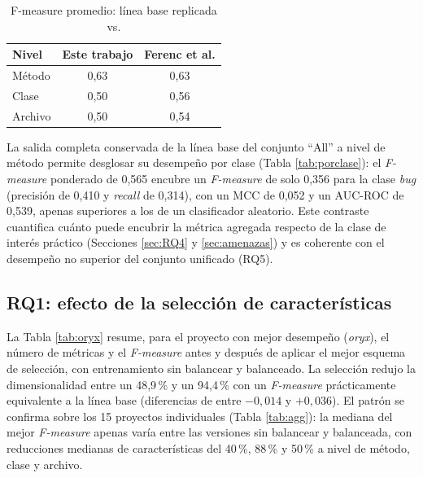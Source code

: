 \documentclass[conference,a4paper]{IEEEtran}
\begin{document}
\begin{table}[H]
\caption{F-measure promedio: línea base replicada vs. \cite{ferenc2020}}
\label{tab:baseline}
\centering
\begin{tabular}{lcc}
\toprule
Nivel & Este trabajo & Ferenc et al. \cite{ferenc2020} \\
\midrule
Método  & 0,63 & 0,63 \\
Clase   & 0,50 & 0,56 \\
Archivo & 0,50 & 0,54 \\
\bottomrule
\end{tabular}
\end{table}

La salida completa conservada de la línea base del conjunto ``All'' a nivel de método permite desglosar su desempeño por clase (Tabla \ref{tab:porclase}): el \textit{F-measure} ponderado de 0,565 encubre un \textit{F-measure} de solo 0,356 para la clase \textit{bug} (precisión de 0,410 y \textit{recall} de 0,314), con un MCC de 0,052 y un AUC-ROC de 0,539, apenas superiores a los de un clasificador aleatorio. Este contraste cuantifica cuánto puede encubrir la métrica agregada respecto de la clase de interés práctico (Secciones \ref{sec:RQ4} y \ref{sec:amenazas}) y es coherente con el desempeño no superior del conjunto unificado (RQ5).

\begin{table}[H]
\caption{Desglose por clase de la línea base (Weka, Random Forest, validación cruzada de 10 particiones) sobre el conjunto ``All'' a nivel de método}
\label{tab:porclase}
\centering
{}
\end{table}

\subsection{RQ1: efecto de la selección de características}
\label{sec:RQ1}

La Tabla \ref{tab:oryx} resume, para el proyecto con mejor desempeño (\textit{oryx}), el número de métricas y el \textit{F-measure} antes y después de aplicar el mejor esquema de selección, con entrenamiento sin balancear y balanceado. La selección redujo la dimensionalidad entre un 48,9\,\% y un 94,4\,\% con un \textit{F-measure} prácticamente equivalente a la línea base (diferencias de entre $-0{,}014$ y $+0{,}036$). El patrón se confirma sobre los 15 proyectos individuales (Tabla \ref{tab:agg}): la mediana del mejor \textit{F-measure} apenas varía entre las versiones sin balancear y balanceada, con reducciones medianas de características del 40\,\%, 88\,\% y 50\,\% a nivel de método, clase y archivo.
\end{document}
